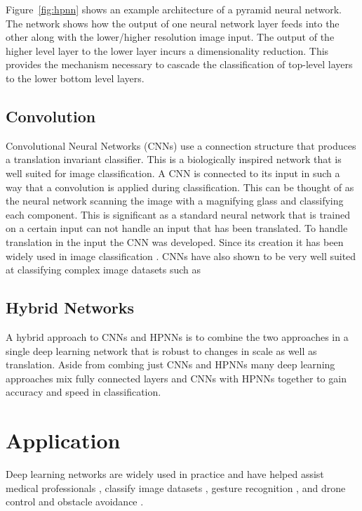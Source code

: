 \documentclass[font=12pt]{article}
\begin{document}
Figure~\ref{fig:hpnn} shows an example architecture of a pyramid neural network. The network shows how the output of one neural network layer feeds into the other along with the lower/higher resolution image input. The output of the higher level layer to the lower layer incurs a dimensionality reduction. This provides the mechanism necessary to cascade the classification of top-level layers to the lower bottom level layers.
\subsection{Convolution}
Convolutional Neural Networks (CNNs) use a connection structure that produces a translation invariant classifier. This is a biologically inspired network that is well suited for image classification. A CNN is connected to its input in such a way that a convolution is applied during classification.  This can be thought of as the neural network scanning the image with a magnifying glass and classifying each component. This is significant as a standard neural network that is trained on a certain input can not handle an input that has been translated. To handle translation in the input the CNN was developed. Since its creation it has been widely used in image classification \cite{6248110,krizhevsky2012imagenet,long2015fully}. CNNs have also shown to be very well suited at classifying complex image datasets such as \cite{deng2009imagenet,Torralba:2008:MTI:1444381.1444403}
\subsection{Hybrid Networks}
A hybrid approach to CNNs and HPNNs is to combine the two approaches in a single deep learning network that is robust to changes in scale as well as translation. Aside from combing just CNNs and HPNNs many deep learning approaches mix fully connected layers and CNNs with HPNNs together to gain accuracy and speed in classification.
\section{Application}
Deep learning networks are widely used in practice and have helped assist medical professionals \cite{sajda2002learning}, classify image datasets \cite{6248110,krizhevsky2012imagenet}, gesture recognition \cite{neverova2014multi}, and drone control and obstacle avoidance \cite{DBLP:journals/corr/ZhangKLA15}.
\end{document}
